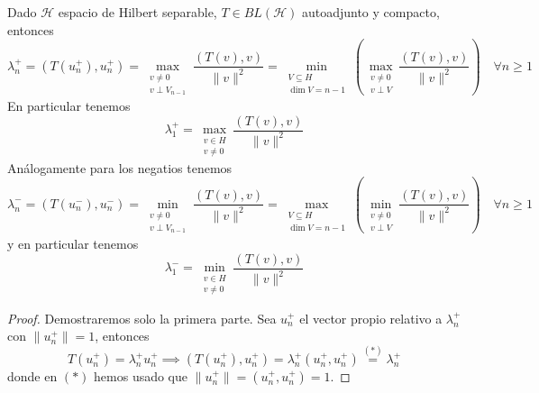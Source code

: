 \begin{teo}
    Dado $\mathcal{H}$ espacio de Hilbert separable, $T \in BL(\mathcal{H})$ autoadjunto y compacto, entonces 
    \begin{equation*}
        \lambda_n^+ = ( T(u_n^+), u_n^+ ) = \max_{\substack{v \neq 0 \\ v \perp V_{n-1}}} \frac{( T(v), v )}{\|v\|^2} = \min_{\substack{V \subseteq H \\ \dim V = n-1}} \left( \max_{\substack{v \neq 0 \\ v \perp V}} \frac{( T(v), v )}{\|v\|^2} \right) \quad \forall n\geq 1
    \end{equation*}
    En particular tenemos
    \begin{equation*}
        \lambda_1^+ = \max_{\substack{v \in H \\ v \neq 0}} \frac{( T(v), v )}{\|v\|^2}
    \end{equation*}
    Análogamente para los negatios tenemos
    \begin{equation*}
        \lambda_n^- = ( T(u_n^-), u_n^- ) = \min_{\substack{v \neq 0 \\ v \perp V_{n-1}}} \frac{( T(v), v )}{\|v\|^2} = \max_{\substack{V \subseteq H \\ \dim V = n-1}} \left( \min_{\substack{v \neq 0 \\ v \perp V}} \frac{( T(v), v )}{\|v\|^2} \right) \quad \forall n\geq 1
    \end{equation*}
    y en particular tenemos
    \begin{equation*}
        \lambda_1^- = \min_{\substack{v \in H \\ v \neq 0}} \frac{( T(v), v )}{\|v\|^2}
    \end{equation*}
\begin{proof}
    Demostraremos solo la primera parte. Sea $u_n^+$ el vector propio relativo a $\lambda_n^+$ con $\|u_n^+\| = 1$, entonces
    \begin{equation*}
        T(u_n^+) = \lambda_n^+ u_n^+ \implies ( T(u_n^+), u_n^+ ) = \lambda_n^+ ( u_n^+, u_n^+ ) \overset{(*)}{=} \lambda_n^+
    \end{equation*}
    donde en $(*)$ hemos usado que $\|u_n^+\|=(u_n^+,u_n^+) = 1$. 
\end{proof}
\end{teo}

